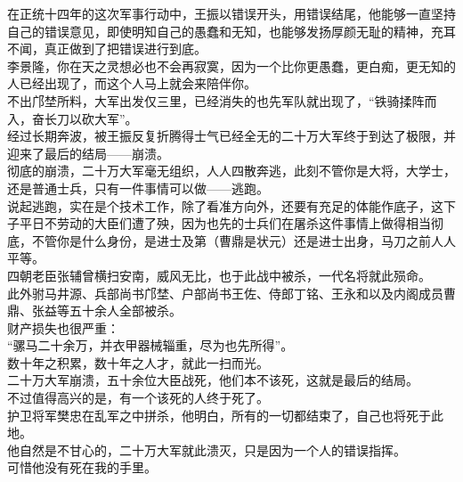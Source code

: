 \begin{multicols}{\theparacolNo}
在正统十四年的这次军事行动中，王振以错误开头，用错误结尾，他能够一直坚持自己的错误意见，即使明知自己的愚蠢和无知，也能够发扬厚颜无耻的精神，充耳不闻，真正做到了把错误进行到底。\\

李景隆，你在天之灵想必也不会再寂寞，因为一个比你更愚蠢，更白痴，更无知的人已经出现了，而这个人马上就会来陪伴你。\\

不出邝埜所料，大军出发仅三里，已经消失的也先军队就出现了，“铁骑揉阵而入，奋长刀以砍大军”。\\

经过长期奔波，被王振反复折腾得士气已经全无的二十万大军终于到达了极限，并迎来了最后的结局——崩溃。\\

彻底的崩溃，二十万大军毫无组织，人人四散奔逃，此刻不管你是大将，大学士，还是普通士兵，只有一件事情可以做——逃跑。\\

说起逃跑，实在是个技术工作，除了看准方向外，还要有充足的体能作底子，这下子平日不劳动的大臣们遭了殃，因为也先的士兵们在屠杀这件事情上做得相当彻底，不管你是什么身份，是进士及第（曹鼎是状元）还是进士出身，马刀之前人人平等。\\

四朝老臣张辅曾横扫安南，威风无比，也于此战中被杀，一代名将就此殒命。\\

此外驸马井源、兵部尚书邝埜、户部尚书王佐、侍郎丁铭、王永和以及内阁成员曹鼎、张益等五十余人全部被杀。\\

财产损失也很严重：\\

“骡马二十余万，并衣甲器械辎重，尽为也先所得”。\\

数十年之积累，数十年之人才，就此一扫而光。\\

二十万大军崩溃，五十余位大臣战死，他们本不该死，这就是最后的结局。\\

不过值得高兴的是，有一个该死的人终于死了。\\

护卫将军樊忠在乱军之中拼杀，他明白，所有的一切都结束了，自己也将死于此地。\\

他自然是不甘心的，二十万大军就此溃灭，只是因为一个人的错误指挥。\\

可惜他没有死在我的手里。\\


\end{multicols}

